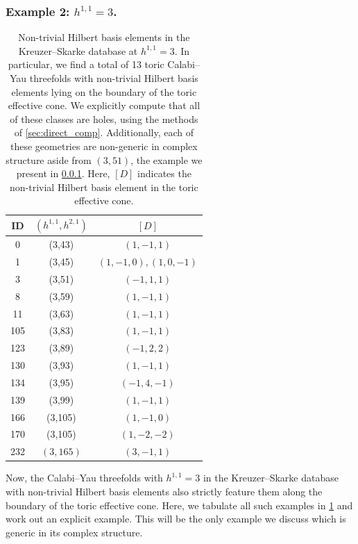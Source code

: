 \documentclass[11pt,dvipsnames]{article}
\theoremstyle{definition}
\begin{document}
\subsubsection{Example 2: $h^{1,1}=3$.}
\label{sec:h113 boundary}

\begin{table}%
    \centering
    \begin{tabular}{c|c|c}
    ID & $(h^{1,1},h^{2,1})$ & $[D]$ \\ 
    \hline
       0 & (3,43) & $(1,-1,1)$ \\ 
       1 & (3,45) & $(1,-1,0),(1,0,-1)$ \\ 
       3 & (3,51) & $(-1,1,1)$ \\ 
       8 & (3,59) & $(1,-1,1)$ \\ 
       11 & (3,63) & $(1,-1,1)$ \\ 
       105 & (3,83) & $(1,-1,1)$ \\ 
       123 & (3,89) & $(-1,2,2)$ \\ 
       130 & (3,93) & $(1,-1,1)$ \\ 
       134 & (3,95) & $(-1,4,-1)$ \\
       139 & (3,99) & $(1,-1,1)$ \\
       166 & (3,105) & $(1,-1,0)$ \\
       170 & (3,105) & $(1,-2,-2)$  \\
       232 & $(3,165)$ & $(3,-1,1)$ \\ 
    \end{tabular}
    \caption{Non-trivial Hilbert basis elements in the Kreuzer--Skarke database at $h^{1,1}=3$. In particular, we find a total of 13 toric Calabi--Yau threefolds with non-trivial Hilbert basis elements lying on the boundary of the toric effective cone. We explicitly compute that all of these classes are holes, using the methods of \cref{sec:direct_comp}. Additionally, each of these geometries are non-generic in complex structure aside from $(3,51)$, the example we present in \cref{sec:h113 boundary}. Here, $[D]$ indicates the non-trivial Hilbert basis element in the toric effective cone.}
    \label{tab:h11=3}
\end{table}

Now, the Calabi--Yau threefolds with $h^{1,1}=3$ in the Kreuzer--Skarke database with non-trivial Hilbert basis elements also strictly feature them along the boundary of the toric effective cone. Here, we tabulate all such examples in \cref{tab:h11=3} and work out an explicit example. This will be the only example we discuss which is generic in its complex structure.
\end{document}

